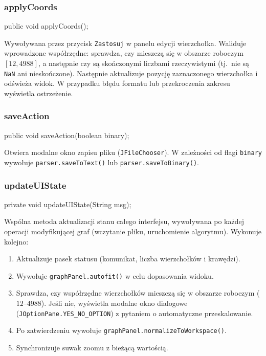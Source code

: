 \documentclass[a4paper, 11pt]{article}
\begin{document}
\subsubsection{applyCoords}

\begin{cmdbox}
public void applyCoords();
\end{cmdbox}

Wywoływana przez przycisk \texttt{Zastosuj} w panelu edycji wierzchołka.
Waliduje wprowadzone współrzędne: sprawdza, czy mieszczą się w obszarze
roboczym $[12, 4988]$, a następnie czy są skończonymi liczbami
rzeczywistymi (tj.\ nie są \texttt{NaN} ani nieskończone).
Następnie aktualizuje pozycję zaznaczonego wierzchołka i odświeża widok.
W przypadku błędu formatu lub przekroczenia zakresu wyświetla ostrzeżenie.

\subsubsection{saveAction}

\begin{cmdbox}
public void saveAction(boolean binary);
\end{cmdbox}

Otwiera modalne okno zapisu pliku (\texttt{JFileChooser}).
W zależności od flagi \texttt{binary} wywołuje \texttt{parser.saveToText()}
lub \texttt{parser.saveToBinary()}.

\subsubsection{updateUIState}

\begin{cmdbox}
private void updateUIState(String msg);
\end{cmdbox}

Wspólna metoda aktualizacji stanu całego interfejsu, wywoływana po każdej
operacji modyfikującej graf (wczytanie pliku, uruchomienie algorytmu).
Wykonuje kolejno:
\begin{enumerate}
  \item Aktualizuje pasek statusu (komunikat, liczba wierzchołków i krawędzi).
  \item Wywołuje \texttt{graphPanel.autofit()} w celu dopasowania widoku.
  \item Sprawdza, czy współrzędne wierzchołków mieszczą się w obszarze roboczym ($12$--$4988$). Jeśli nie, wyświetla modalne okno dialogowe (\texttt{JOptionPane.YES\_NO\_OPTION}) z pytaniem o automatyczne przeskalowanie.
  \item Po zatwierdzeniu wywołuje \texttt{graphPanel.normalizeToWorkspace()}.
  \item Synchronizuje suwak zoomu z bieżącą wartością.
\end{enumerate}
\end{document}
